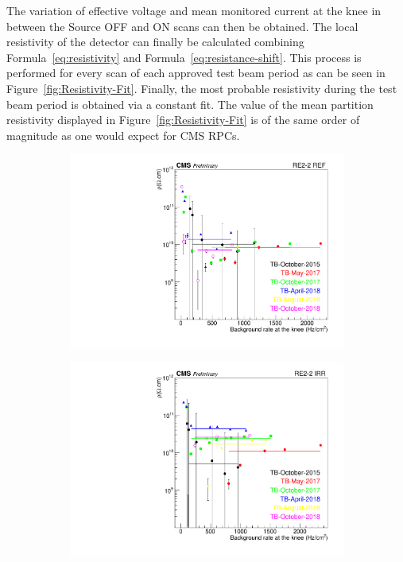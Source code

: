 	The variation of effective voltage and mean monitored current at the knee in between the Source OFF and ON scans can then be obtained. The local resistivity of the detector can finally be calculated combining Formula~\ref{eq:resistivity} and Formula~\ref{eq:resistance-shift}. This process is performed for every scan of each approved test beam period as can be seen in Figure~\ref{fig:Resistivity-Fit}. Finally, the most probable resistivity during the test beam period is obtained via a constant fit. The value of the mean partition resistivity displayed in Figure~\ref{fig:Resistivity-Fit} is of the same order of magnitude as one would expect for CMS RPCs.
	
	\begin{figure}[H]
    	\begin{subfigure}{0.5\linewidth}
			\centering
    		\includegraphics[width = \linewidth]{fig/chapt5/Resistivity-vs-Rate-BARC-8.pdf}
        	\caption{\label{fig:Resistivity-Fit:A}}
    	\end{subfigure}
    	\begin{subfigure}{0.5\linewidth}
			\centering
    		\includegraphics[width = \linewidth]{fig/chapt5/Resistivity-vs-Rate-BARC-9.pdf}

\end{subfigure}
\end{figure}
